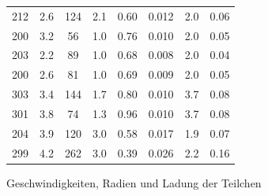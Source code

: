 \documentclass{scrartcl}
\begin{document}
\begin{figure}[H]
{\begin{tabular}{c|c|c|c|c|c|c|c}
                            212 & 2.6 & 124 & 2.1 & 0.60 & 0.012 & 2.0 & 0.06\\
                            200 & 3.2 & 56 & 1.0 & 0.76 & 0.010 & 2.0 & 0.05\\
                            203 & 2.2 & 89 & 1.0 & 0.68 & 0.008 & 2.0 & 0.04\\
                            200 & 2.6 & 81 & 1.0 & 0.69 & 0.009 & 2.0 & 0.05\\
                            303 & 3.4 & 144 & 1.7 & 0.80 & 0.010 & 3.7 & 0.08\\
                            301 & 3.8 & 74 & 1.3 & 0.96 & 0.010 & 3.7 & 0.08\\
                            204 & 3.9 & 120 & 3.0 & 0.58 & 0.017 & 1.9 & 0.07\\
                            299 & 4.2 & 262 & 3.0 & 0.39 & 0.026 & 2.2 & 0.16\\
                        \end{tabular}
                        }
                        \caption{Geschwindigkeiten, Radien und Ladung der Teilchen}
                        \label{Tab1}
                    \end{figure} 
\end{document}
